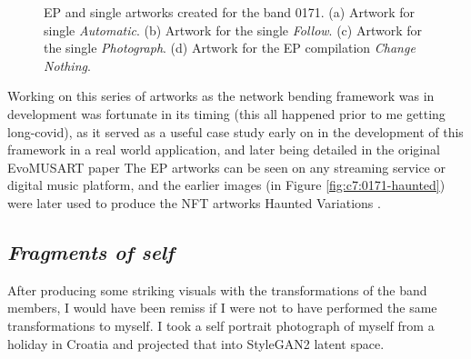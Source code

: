 \begin{figure}[!htbp]
    \caption{EP and single artworks created for the band 0171. (a) Artwork for single \textit{Automatic}. (b) Artwork for the single \textit{Follow}. (c) Artwork for the single \textit{Photograph}. (d) Artwork for the EP compilation \textit{Change Nothing}.}
    \label{fig:c7:0171-EP}
 \end{figure}

Working on this series of artworks as the network bending framework was in development was fortunate in its timing (this all happened prior to me getting long-covid), as it served as a useful case study early on in the development of this framework in a real world application, and later being detailed in the original EvoMUSART paper \citep{broad2021network} 
The EP artworks can be seen on any streaming service or digital music platform, and the earlier images (in Figure \ref{fig:c7:0171-haunted}) were later used to produce the NFT artworks Haunted Variations \citep{broad2021haunted1,broad2021haunted2}. 

\subsection{\textit{Fragments of self}}
\label{c6:subsubsec:fragments}

After producing some striking visuals with the transformations of the band members, I would have been remiss if I were not to have performed the same transformations to myself. 
I took a self portrait photograph of myself from a holiday in Croatia and projected that into StyleGAN2 latent space. 


